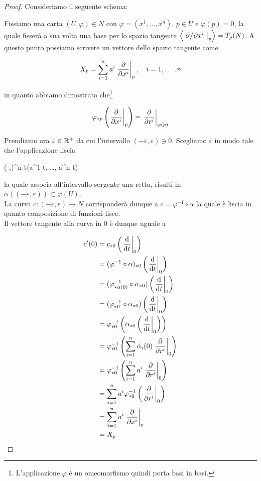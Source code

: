 \begin{proof}
	Consideriamo il seguente schema:
	

	Fissiamo una carta $ (U,\varphi) \in N $ con $ \varphi = (x^{1},\dots,x^{n}) $, $ p \in U $ e $ \varphi(p) = 0 $, la quale fisserà a sua volta una base per lo spazio tangente $ \ev{ \eval{ \pdv*{x^{i}} }_{p} } = T_{p}(N) $. A questo punto possiamo scrivere un vettore dello spazio tangente come
	
	\begin{equation}
		X_{p} = \sum_{i=1}^{n} a^{i} \eval{ \pdv{x^{i}} }_{p} \qcomma i=1,\dots,n
	\end{equation}

	in quanto abbiamo dimostrato che\footnote{%
		L'applicazione $ \varphi $ è un omeomorfismo quindi porta basi in basi.%
	}
	
	\begin{equation}
		\varphi_{*p} \left( \eval{ \pdv{x^{i}} }_{p} \right) = \eval{ \pdv{r^{i}} }_{\varphi(p)}
	\end{equation}
	
	Prendiamo ora $ \varepsilon \in \mathbb{R}^{+} $ da cui l'intervallo $ (-\varepsilon,\varepsilon) \ni 0 $. Scegliamo $ \varepsilon $ in modo tale che l'applicazione liscia
	
	\map{\alpha}
		{(-\varepsilon,\varepsilon)}{\R^{n}}
		{t}{(a^{1} t, \dots, a^{n} t)}

	la quale associa all'intervallo sorgente una retta, risulti in $ \alpha((-\varepsilon,\varepsilon)) \subset \varphi(U) $. \\
	La curva $ c : (-\varepsilon,\varepsilon) \to N $ corrisponderà dunque a $ c = \varphi^{-1} \circ \alpha $ la quale è liscia in quanto composizione di funzioni lisce. \\
	Il vettore tangente alla curva in 0 è dunque uguale a
	
	\begin{align}
		\begin{split}
			c'(0) &= c_{*0} \left( \eval{ \dv{t} }_{0} \right) \\
			&= (\varphi^{-1} \circ \alpha)_{*0} \left( \eval{ \dv{t} }_{0} \right) \\
			&= (\varphi^{-1}_{*\alpha(0)} \circ \alpha_{*0}) \left( \eval{ \dv{t} }_{0} \right) \\
			&= (\varphi^{-1}_{*0} \circ \alpha_{*0}) \left( \eval{ \dv{t} }_{0} \right) \\
			&= \varphi^{-1}_{*0} \left( \alpha_{*0} \left( \eval{ \dv{t} }_{0} \right) \right) \\
			&= \varphi^{-1}_{*0} \left( \sum_{i=1}^{n} \dot{\alpha}_{i}(0) \eval{ \pdv{r^{i}} }_{0} \right) \\
			&= \varphi^{-1}_{*0} \left( \sum_{i=1}^{n} a^{i} \eval{ \pdv{r^{i}} }_{0} \right) \\
			&= \sum_{i=1}^{n} a^{i} \varphi^{-1}_{*0} \left( \eval{ \pdv{r^{i}} }_{0} \right) \\
			&= \sum_{i=1}^{n} a^{i} \eval{ \pdv{x^{i}} }_{p} \\
			&= X_{p}
		\end{split}
	\end{align}


\end{proof}
